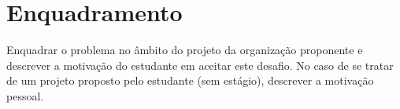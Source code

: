 \section{Enquadramento} %
\label{sec:enquadramento}
Enquadrar o problema no âmbito do projeto da organização proponente e descrever a motivação do estudante em aceitar este desafio. No caso de se tratar de um projeto proposto pelo estudante (sem estágio), descrever a motivação pessoal.

